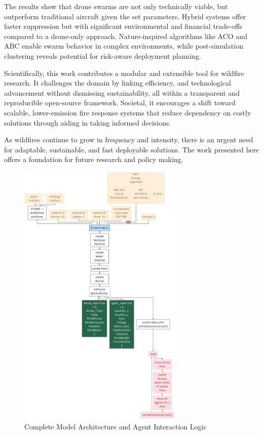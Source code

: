 \documentclass[11pt, a4paper]{article}
\begin{document}
The results show that drone swarms are not only technically viable, but outperform traditional aircraft given the set parameters. Hybrid systems offer faster suppression but with significant environmental and financial trade-offs compared to a drone-only approach. Nature-inspired algorithms like ACO and ABC enable swarm behavior in complex environments, while post-simulation clustering reveals potential for risk-aware deployment planning.

Scientifically, this work contributes a modular and extensible tool for wildfire research. It challenges the domain by linking efficiency, and technological advancement without dismissing sustainability, all within a transparent and reproducible open-source framework. Societal, it encourages a shift toward scalable, lower-emission fire response systems that reduce dependency on costly solutions through aiding in taking informed decisions.

As wildfires continue to grow in frequency and intensity, there is an urgent need for adaptable, sustainable, and fast deployable solutions. The work presented here offers a foundation for future research and policy making.





\appendix
\label{app:modellogic}

\begin{figure}[H]
    \centering
    \includegraphics[width=0.7\textwidth]{figures/modellogic.png}
    \caption{Complete Model Architecture and Agent Interaction Logic}
    \label{fig:modellogic}
\end{figure}
\end{document}
